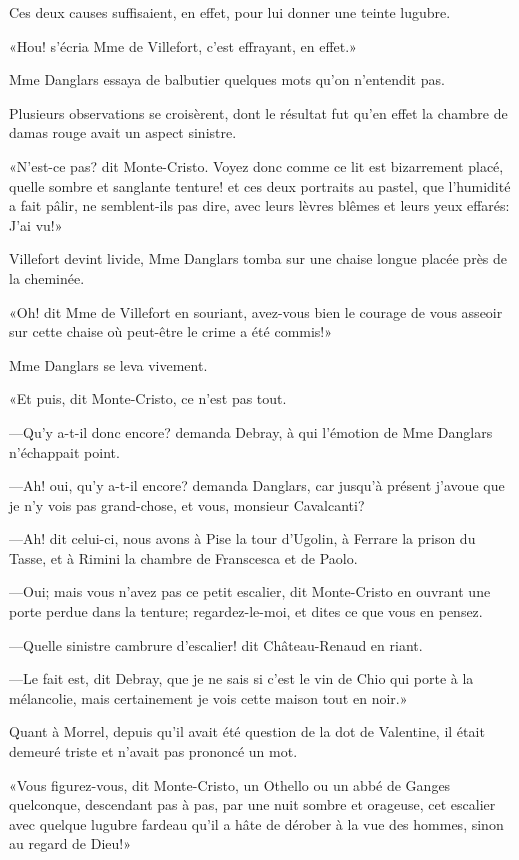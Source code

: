Ces deux causes suffisaient, en effet, pour lui donner une teinte lugubre. 

«Hou! s'écria Mme de Villefort, c'est effrayant, en effet.» 

Mme Danglars essaya de balbutier quelques mots qu'on n'entendit pas. 

Plusieurs observations se croisèrent, dont le résultat fut qu'en effet la chambre de damas rouge avait un aspect sinistre. 

«N'est-ce pas? dit Monte-Cristo. Voyez donc comme ce lit est bizarrement placé, quelle sombre et sanglante tenture! et ces deux portraits au pastel, que l'humidité a fait pâlir, ne semblent-ils pas dire, avec leurs lèvres blêmes et leurs yeux effarés: J'ai vu!» 

Villefort devint livide, Mme Danglars tomba sur une chaise longue placée près de la cheminée. 

«Oh! dit Mme de Villefort en souriant, avez-vous bien le courage de vous asseoir sur cette chaise où peut-être le crime a été commis!» 

Mme Danglars se leva vivement. 

«Et puis, dit Monte-Cristo, ce n'est pas tout. 

—Qu'y a-t-il donc encore? demanda Debray, à qui l'émotion de Mme Danglars n'échappait point. 

—Ah! oui, qu'y a-t-il encore? demanda Danglars, car jusqu'à présent j'avoue que je n'y vois pas grand-chose, et vous, monsieur Cavalcanti? 

—Ah! dit celui-ci, nous avons à Pise la tour d'Ugolin, à Ferrare la prison du Tasse, et à Rimini la chambre de Franscesca et de Paolo. 

—Oui; mais vous n'avez pas ce petit escalier, dit Monte-Cristo en ouvrant une porte perdue dans la tenture; regardez-le-moi, et dites ce que vous en pensez. 

—Quelle sinistre cambrure d'escalier! dit Château-Renaud en riant. 

—Le fait est, dit Debray, que je ne sais si c'est le vin de Chio qui porte à la mélancolie, mais certainement je vois cette maison tout en noir.» 

Quant à Morrel, depuis qu'il avait été question de la dot de Valentine, il était demeuré triste et n'avait pas prononcé un mot. 

«Vous figurez-vous, dit Monte-Cristo, un Othello ou un abbé de Ganges quelconque, descendant pas à pas, par une nuit sombre et orageuse, cet escalier avec quelque lugubre fardeau qu'il a hâte de dérober à la vue des hommes, sinon au regard de Dieu!» 

